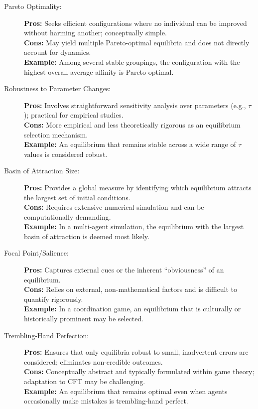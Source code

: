 \documentclass{article}
\begin{document}
\begin{description}
  \item[Pareto Optimality:] 
    \textbf{Pros:} Seeks efficient configurations where no individual can be improved without harming another; conceptually simple.\\
    \textbf{Cons:} May yield multiple Pareto-optimal equilibria and does not directly account for dynamics.\\
    \textbf{Example:} Among several stable groupings, the configuration with the highest overall average affinity is Pareto optimal.
    
  \item[Robustness to Parameter Changes:] 
    \textbf{Pros:} Involves straightforward sensitivity analysis over parameters (e.g., $\tau$); practical for empirical studies.\\
    \textbf{Cons:} More empirical and less theoretically rigorous as an equilibrium selection mechanism.\\
    \textbf{Example:} An equilibrium that remains stable across a wide range of $\tau$ values is considered robust.
    
  \item[Basin of Attraction Size:] 
    \textbf{Pros:} Provides a global measure by identifying which equilibrium attracts the largest set of initial conditions.\\
    \textbf{Cons:} Requires extensive numerical simulation and can be computationally demanding.\\
    \textbf{Example:} In a multi-agent simulation, the equilibrium with the largest basin of attraction is deemed most likely.
    
  \item[Focal Point/Salience:] 
    \textbf{Pros:} Captures external cues or the inherent “obviousness” of an equilibrium.\\
    \textbf{Cons:} Relies on external, non-mathematical factors and is difficult to quantify rigorously.\\
    \textbf{Example:} In a coordination game, an equilibrium that is culturally or historically prominent may be selected.
    
  \item[Trembling-Hand Perfection:] 
    \textbf{Pros:} Ensures that only equilibria robust to small, inadvertent errors are considered; eliminates non-credible outcomes.\\
    \textbf{Cons:} Conceptually abstract and typically formulated within game theory; adaptation to CFT may be challenging.\\
    \textbf{Example:} An equilibrium that remains optimal even when agents occasionally make mistakes is trembling-hand perfect.
    

\end{description}
\end{document}
